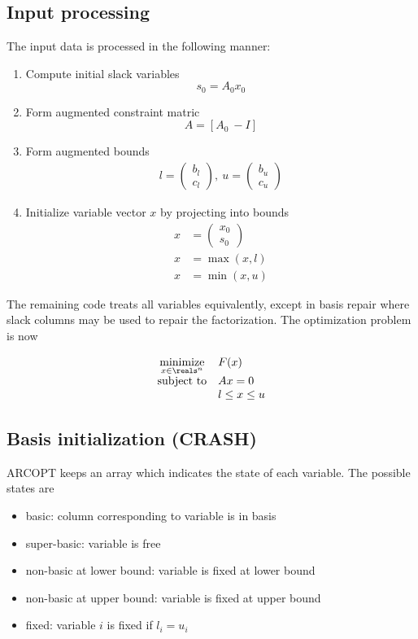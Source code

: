 \documentclass[11pt]{article}
\begin{document}
\subsection{Input processing}

The input data is processed in the following manner:
\begin{enumerate}
\item Compute initial slack variables \[ s_0 = A_0 x_0 \]
\item Form augmented constraint matric \[ A = [A_0\ -I] \]
\item Form augmented bounds
\begin{align*}
l = \begin{pmatrix} b_l \\ c_l \end{pmatrix},\
u = \begin{pmatrix} b_u \\ c_u \end{pmatrix}
\end{align*}
\item Initialize variable vector $x$ by projecting into bounds
\begin{align*}
x &= \begin{pmatrix}x_0 \\ s_0 \end{pmatrix} \\
x &= \max(x,l) \\
x &= \min(x,u)
\end{align*}
\end{enumerate}

The remaining code treats all variables equivalently, except in basis repair
where slack columns may be used to repair the factorization.  The optimization
problem is now

\begin{equation*}\label{eq:LC2}
\begin{array}{cl}
\underset{x\in \reals^n}{\mbox{minimize}} & F(x) \\
\mbox{subject to} & Ax = 0 \\
 & l \le x \le u
\end{array}
\end{equation*}

\subsection{Basis initialization (CRASH)}

ARCOPT keeps an array which indicates the state of each variable.  The possible
states are
\begin{itemize}
\item basic: column corresponding to variable is in basis
\item super-basic: variable is free
\item non-basic at lower bound: variable is fixed at lower bound
\item non-basic at upper bound: variable is fixed at upper bound
\item fixed: variable $i$ is fixed if $l_i = u_i$
\end{itemize}
\end{document}
